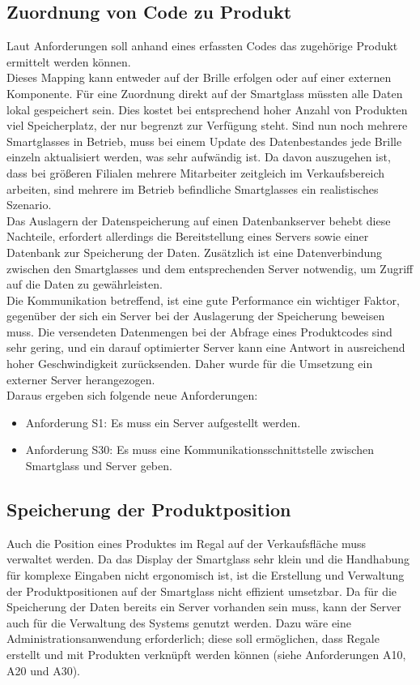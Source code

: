 \subsection{Zuordnung von Code zu Produkt}
Laut Anforderungen soll anhand eines erfassten Codes das zugehörige Produkt ermittelt werden können.\\
Dieses Mapping kann entweder auf der Brille erfolgen oder auf einer externen Komponente. Für eine Zuordnung direkt auf der Smartglass müssten alle Daten lokal gespeichert sein. Dies kostet bei entsprechend hoher Anzahl von Produkten viel Speicherplatz, der nur begrenzt zur Verfügung steht. Sind nun noch mehrere Smartglasses in Betrieb, muss bei einem Update des Datenbestandes jede Brille einzeln aktualisiert werden, was sehr aufwändig ist. Da davon auszugehen ist, dass bei größeren Filialen mehrere Mitarbeiter zeitgleich im Verkaufsbereich arbeiten, sind mehrere im Betrieb befindliche Smartglasses ein realistisches Szenario.\\
Das Auslagern der Datenspeicherung auf einen Datenbankserver behebt diese Nachteile, erfordert allerdings die Bereitstellung eines Servers sowie einer Datenbank zur Speicherung der Daten. Zusätzlich ist eine Datenverbindung zwischen den Smartglasses und dem entsprechenden Server notwendig, um Zugriff auf die Daten zu gewährleisten.\\
Die Kommunikation betreffend, ist eine gute Performance ein wichtiger Faktor, gegenüber der sich ein Server bei der Auslagerung der Speicherung beweisen muss. Die versendeten Datenmengen bei der Abfrage eines Produktcodes sind sehr gering, und ein darauf optimierter Server kann eine Antwort in ausreichend hoher Geschwindigkeit zurücksenden. Daher wurde für die Umsetzung ein externer Server herangezogen.\\

Daraus ergeben sich folgende neue Anforderungen: 
\begin{itemize}
	\item Anforderung S1: Es muss ein Server aufgestellt werden.
	\item Anforderung S30: Es muss eine Kommunikationsschnittstelle zwischen Smartglass und Server geben.
\end{itemize}

\subsection{Speicherung der Produktposition}
Auch die Position eines Produktes im Regal auf der Verkaufsfläche muss verwaltet werden. Da das Display der Smartglass sehr klein und die Handhabung für komplexe Eingaben nicht ergonomisch ist, ist die Erstellung und Verwaltung der Produktpositionen auf der Smartglass nicht effizient umsetzbar. Da für die Speicherung der Daten bereits ein Server vorhanden sein muss, kann der Server auch für die Verwaltung des Systems genutzt werden. Dazu wäre eine Administrationsanwendung erforderlich; diese soll ermöglichen, dass Regale erstellt und mit Produkten verknüpft werden können (siehe Anforderungen A10, A20 und A30).\\

